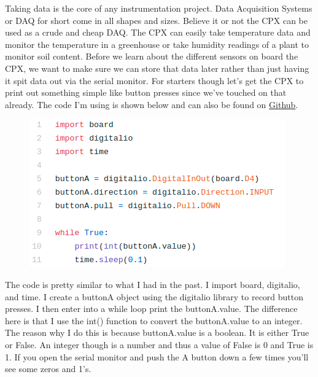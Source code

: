 Taking data is the core of any instrumentation project. Data
Acquisition Systems or DAQ for short come in all shapes and
sizes. Believe it or not the CPX can be used as a crude and cheap
DAQ. The CPX can easily take temperature data and monitor the
temperature in a greenhouse or take humidity readings of a plant to
monitor soil content. Before we learn about the different sensors on
board the CPX, we want to make sure we can store that data later
rather than just having it spit data out via the serial monitor. For
starters though let’s get the CPX to print out something simple like
button presses since we’ve touched on that already. The code I’m using
is shown below and can also be found on
\href{https://github.com/cmontalvo251/Microcontrollers/blob/master/Circuit_Playground/CircuitPython/Data_Logging/button_presses.py}{Github}.
\begin{figure}[H]
  \begin{center}
    \includegraphics[width=\textwidth]{Figures/button_presses.png}
  \end{center}
\end{figure}
The code is pretty similar to what I had in the past. I import board,
digitalio, and time. I create a buttonA object using the digitalio
library to record button presses. I then enter into a while loop print
the buttonA.value. The difference here is that I use the int()
function to convert the buttonA.value to an integer. The reason why I
do this is because buttonA.value is a boolean. It is either True or
False. An integer though is a number and thus a value of False is 0
and True is 1. If you open the serial monitor and push the A button
down a few times you’ll see some zeros and 1’s.
